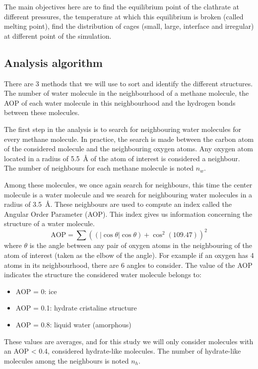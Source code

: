The main objectives here are to find the equilibrium point of the clathrate at different pressures, the temperature at which this equilibrium is broken (called melting point), find the distribution of cages (small, large, interface and irregular) at different point of the simulation.

\subsection{Analysis algorithm}
There are 3 methods that we will use to sort and identify the different structures. The number of water molecule in the neighbourhood of a methane molecule, the AOP of each water molecule in this neighbourhood and the hydrogen bonds between these molecules.

The first step in the analysis is to search for neighbouring water molecules for every methane molecule. In practice, the search is made between the carbon atom of the considered molecule and the neighbouring oxygen atoms.
Any oxygen atom located in a radius of \SI{5.5}{\angstrom} of the atom of interest is considered a neighbour. The number of neighbours for each methane molecule is noted $n_w$.

Among these molecules, we once again search for neighbours, this time the center molecule is a water molecule and we search for neighbouring water molecules in a radius of \SI{3.5}{\angstrom}.
These neighbours are used to compute an index called the Angular Order Parameter (AOP). This index gives us information concerning the structure of a water molecule.
\[
    \text{AOP} = \sum \left( \left( \left|\cos \theta \right| \cos \theta \right) + \cos^2 (109.47)\right)^2
\]
where $\theta$ is the angle between any pair of oxygen atoms in the neighbouring of the atom of interest (taken as the elbow of the angle). For example if an oxygen has 4 atoms in its neighbourhood, there are 6 angles to consider. The value of the AOP indicates the structure the considered water molecule belongs to:

\begin{itemize}
    \item AOP = \num{0}: ice
    \item AOP = \num{0.1}: hydrate cristaline structure
    \item AOP = \num{0.8}: liquid water (amorphous)
\end{itemize}

These values are averages, and for this study we will only consider molecules with an AOP < \num{0.4}, considered hydrate-like molecules. The number of hydrate-like molecules among the neighbours is noted $n_h$.

